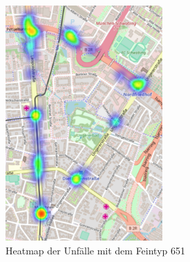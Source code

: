 \begin{savenotes}
	\begin{figure}[H]
		\centering
		\includegraphics[width=6cm,height=9cm]{figures/HM_651}
		\caption[Heatmap der Unfälle mit dem Feintyp 651]{Heatmap der Unfälle mit dem Feintyp 651}\label{fig:Heatmap_651}
	\end{figure}
\end{savenotes}